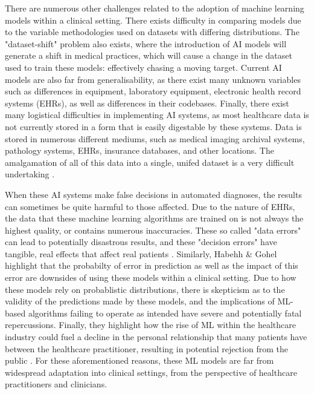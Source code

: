 \documentclass[12pt]{article}
\begin{document}
There are numerous other challenges related to the adoption of machine learning models within a clinical setting. There exists difficulty in comparing models due to the variable methodologies used on datasets with differing distributions. The "dataset-shift" problem also exists, where the introduction of AI models will generate a shift in medical practices, which will cause a change in the dataset used to train these models: effectively chasing a moving target. Current AI models are also far from generalisability, as there exist many unknown variables such as differences in equipment, laboratory equipment, electronic health record systems (EHRs), as well as differences in their codebases. Finally, there exist many logistical difficulties in implementing AI systems, as most healthcare data is not currently stored in a form that is easily digestable by these systems. Data is stored in numerous different mediums, such as medical imaging archival systems, pathology systems, EHRs, insurance databases, and other locations. The amalgamation of all of this data into a single, unifed dataset is a very difficult undertaking \citep{Kelly_2019}. \

When these AI systems make false decisions in automated diagnoses, the results can sometimes be quite harmful to those affected. Due to the nature of EHRs, the data that these machine learning algorithms are trained on is not always the highest quality, or contains numerous inaccuracies. These so called "data errors" can lead to potentially disastrous results, and these "decision errors" have tangible, real effects that affect real patients \citep{Ali_2023}. Similarly, Habehh \& Gohel highlight that the probabilty of error in prediction as well as the impact of this error are downsides of using these models within a clinical setting. Due to how these models rely on probablistic distributions, there is skepticism as to the validity of the predictions made by these models, and the implications of ML-based algorithms failing to operate as intended have severe and potentially fatal repercussions. Finally, they highlight how the rise of ML within the healthcare industry could fuel a decline in the personal relationship that many patients have between the healthcare practitioner, resulting in potential rejection from the public \citep{Habehh_2021}. For these aforementioned reasons, these ML models are far from widespread adaptation into clinical settings, from the perspective of healthcare practitioners and clinicians. \

\vspace{-5mm}
\end{document}
